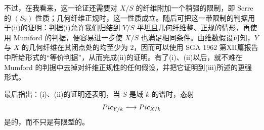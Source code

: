 不过，在我看来，这一论证还需要对 $X/S$ 的纤维附加一个稍强的限制，即 Serre 的 $(S_2)$ 性质；几何纤维正规时，这一性质成立。随后可把这一带限制的判据用于(ii)的证明：判据(i)允许我们归结到 $Y/S$ 平坦且几何纤维整、正规的情形，再使用 Mumford 的判据，便容易进一步使 $X/S$ 也满足相同条件。由维数假设可知，$Y$ 与 $X$ 的几何纤维在其闭点处的均至少为 $2$，因而可以使用 SGA 1962 第XII篇报告中所给形式的“等价判据”，从而完成(ii)的证明。有了(i)、(ii)以后，就不难在 Mumford 的判据中去掉对纤维正规性的任何假设，并把它证明到(iii)所述的更强形式。

最后指出：(i)、(ii)的证明还表明，当 $S$ 是域 $k$ 的谱时，态射
\[
Pic_{Y/k}\longrightarrow Pic_{X/k}
\]
是的，而不只是有限型的。
